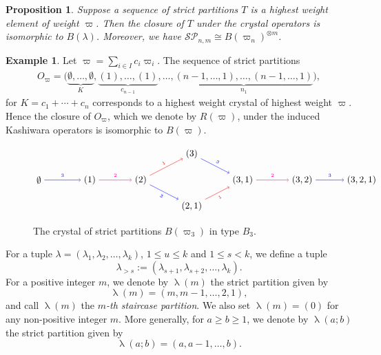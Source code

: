 \documentclass[11pt, leqno]{amsart}
\theoremstyle{plain}
\newtheorem{proposition}[theorem]{Proposition}
\theoremstyle{definition}
\newtheorem{example}[theorem]{Example}
\numberwithin{equation}{section}
\newcommand{\iso}{\cong} %
\newcommand{\fw}{\varpi} %
\newcommand{\seteq}{\mathbin{:=}}
\newcommand{\defn}[1]{{\color{darkred}\emph{#1}}} %
\begin{document}
\begin{proposition}
\label{prop:SSRT_hw}
Suppose a sequence of strict partitions $T$ is a highest weight element of weight $\fw$. Then the closure of $T$ under the crystal operators is isomorphic to $B(\lambda)$. Moreover, we have $\mathcal{SP}_{n,m} \iso B(\fw_n)^{\otimes m}$.
\end{proposition}

\begin{example}
Let $\varpi = \sum_{i \in I} c_i \fw_i$. The sequence of strict partitions
\begin{align}\label{eq: def Ow}
O_{\varpi} = \bigl( \underbrace{\emptyset, \dotsc, \emptyset}_K, \underbrace{(1), \dotsc, (1)}_{c_{n-1}}, \dotsc, \underbrace{(n-1, \dotsc, 1), \dotsc, (n-1, \dotsc, 1)}_{n_1} \bigr),
\end{align}
for $K = c_1 + \cdots + c_n$ corresponds to a highest weight crystal of highest weight $\varpi$. Hence the closure of $O_{\fw}$, which we denote by $R(\fw)$, under the induced Kashiwara operators is isomorphic to $B(\varpi)$.
\end{example}

\begin{figure}
\[
\begin{tikzpicture}[xscale=1.3,baseline=-4]
\node (e) at (0,0) {$\emptyset$};
\node (1) at (1.5,0) {$(1)$};
\node (2) at (3,0) {$(2)$};
\node (3) at (4.5,1) {$(3)$};
\node (21) at (4.5,-1) {$(2,1)$};
\node (31) at (6,0) {$(3,1)$};
\node (32) at (7.75,0) {$(3,2)$};
\node (321) at (9.5,0) {$(3,2,1)$};
\draw[->,blue] (e) to node[above]{\tiny$3$} (1);
\draw[->,magenta] (1) to node[above]{\tiny$2$} (2);
\draw[->,red] (2) to node[above,sloped]{\tiny$1$} (3);
\draw[->,blue] (3) to node[above,sloped]{\tiny$3$} (31);
\draw[->,blue] (2) to node[below,sloped]{\tiny$3$} (21);
\draw[->,red] (21) to node[below,sloped]{\tiny$1$} (31);
\draw[->,magenta] (31) to node[above]{\tiny$2$} (32);
\draw[->,blue] (32) to node[above]{\tiny$3$} (321);
\end{tikzpicture}
\]
\caption{The crystal of strict partitions $B(\fw_3)$ in type $B_3$.}
\label{fig:strict3}
\end{figure}

For a tuple $\lambda = (\lambda_1,\lambda_2,\ldots,\lambda_k)$, $1 \le u \le k$ and $1 \le s < k$, we define a tuple
\[
\lambda_{> s} \seteq (\lambda_{s+1},\lambda_{s+2},\ldots,\lambda_k).
\]
For a positive integer $m$, we denote by $\uplambda(m)$ the strict partition given by
\[
\uplambda(m) = (m,m-1,\ldots,2,1),
\]
and call $\uplambda (m)$ the \defn{$m$-th staircase partition}. We also set $\uplambda(m)=(0)$ for any non-positive integer $m$. More generally, for $ a \ge b \ge 1$, we denote by $\uplambda(a;b)$ the strict partition given by
\[
\uplambda(a;b)=(a,a-1,\ldots,b).
\]
\end{document}
